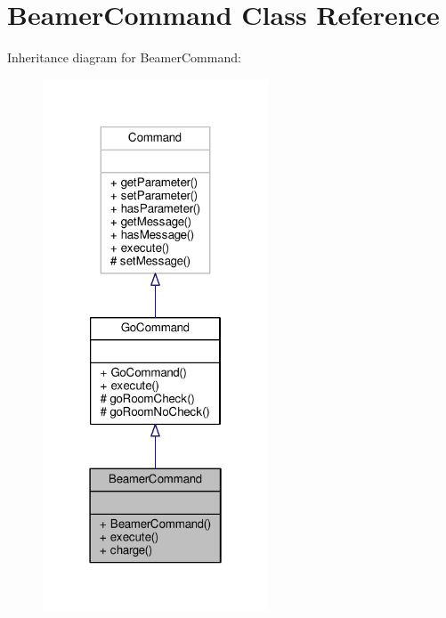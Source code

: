\hypertarget{classBeamerCommand}{\section{Beamer\-Command Class Reference}
\label{classBeamerCommand}
}


Inheritance diagram for Beamer\-Command\-:
\nopagebreak
\begin{figure}[H]
\begin{center}
\leavevmode
\includegraphics[width=190pt]{classBeamerCommand__inherit__graph}
\end{center}
\end{figure}


